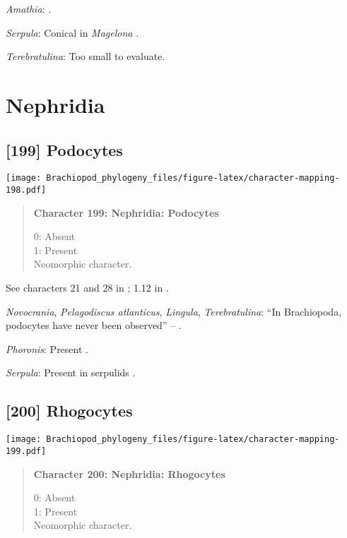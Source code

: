 \documentclass[openany]{book}
\theoremstyle{definition}
\theoremstyle{definition}
\theoremstyle{definition}
\theoremstyle{remark}
\begin{document}
\hypertarget{Amathia-coding-198}{}
\emph{Amathia}: \citet{Reed1982}.

\hypertarget{Serpula-coding-198}{}
\emph{Serpula}: Conical in \emph{Magelona} \citep{Bartolomaeus1995}.

\hypertarget{Terebratulina-coding-198}{}
\emph{Terebratulina}: Too small to evaluate.

\section{Nephridia}\label{nephridia}

\subsection*{{[}199{]} Podocytes}\label{podocytes}

\texttt{[image: Brachiopod\_phylogeny\_files/figure-latex/character-mapping-198.pdf]}

\begin{quote}
\textbf{Character 199: Nephridia: Podocytes}

0: Absent\\
1: Present\\
Neomorphic character.
\end{quote}

See characters 21 and 28 in \citet{Haszprunar2000}; 1.12 in
\citet{Scheltema1993}.

\hypertarget{Lingula-coding-199}{}
\emph{Novocrania}, \emph{Pelagodiscus atlanticus}, \emph{Lingula},
\emph{Terebratulina}: ``In Brachiopoda, podocytes have never been
observed'' -- \citet{Luter1995}.

\hypertarget{Phoronis-coding-199}{}
\emph{Phoronis}: Present \citep{Storch1978}.

\hypertarget{Serpula-coding-199}{}
\emph{Serpula}: Present in serpulids \citep{Bartolomaeus2005}.

\subsection*{{[}200{]} Rhogocytes}\label{rhogocytes}

\texttt{[image: Brachiopod\_phylogeny\_files/figure-latex/character-mapping-199.pdf]}

\begin{quote}
\textbf{Character 200: Nephridia: Rhogocytes}

0: Absent\\
1: Present\\
Neomorphic character.
\end{quote}
\end{document}
